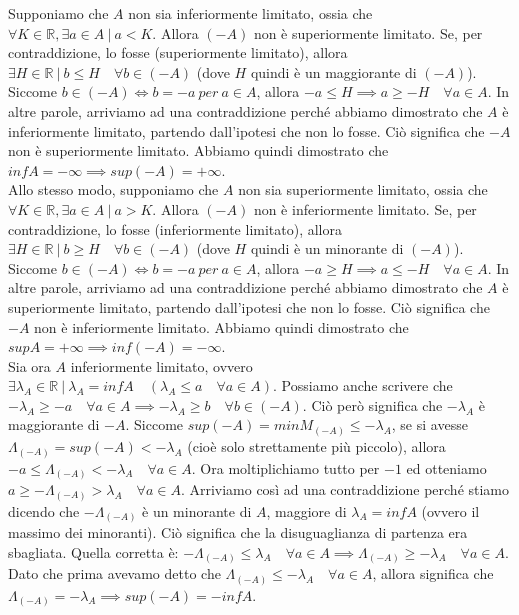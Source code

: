 \documentclass{article}
\begin{document}
\noindent Supponiamo che $A$ non sia inferiormente limitato, ossia che $\forall K \in \mathbb{R}, \exists a \in A \ | \ a < K$. Allora $(-A)$ non è superiormente limitato. Se, per contraddizione, lo fosse (superiormente limitato), allora $\exists H \in \mathbb{R} \ | \ b \leq H \quad \forall b \in (-A)$ (dove $H$ quindi è un maggiorante di $(-A)$). Siccome $b \in (-A) \iff b = -a \ per \ a \in A$, allora $-a \leq H \implies a \geq -H \quad \forall a \in A$. In altre parole, arriviamo ad una contraddizione perché abbiamo dimostrato che $A$ è inferiormente limitato, partendo dall'ipotesi che non lo fosse. Ciò significa che $-A$ non è superiormente limitato. Abbiamo quindi dimostrato che $infA = - \infty \implies sup(-A) = + \infty$.\\
Allo stesso modo, supponiamo che $A$ non sia superiormente limitato, ossia che $\forall K \in \mathbb{R}, \exists a \in A \ | \ a > K$. Allora $(-A)$ non è inferiormente limitato. Se, per contraddizione, lo fosse (inferiormente limitato), allora $\exists H \in \mathbb{R} \ | \ b \geq H \quad \forall b \in (-A)$ (dove $H$ quindi è un minorante di $(-A)$). Siccome $b \in (-A) \iff b = -a \ per \ a \in A$, allora $-a \geq H \implies a \leq -H \quad \forall a \in A$. In altre parole, arriviamo ad una contraddizione perché abbiamo dimostrato che $A$ è superiormente limitato, partendo dall'ipotesi che non lo fosse. Ciò significa che $-A$ non è inferiormente limitato. Abbiamo quindi dimostrato che $supA = + \infty \implies inf(-A) = - \infty$.\\
\noindent Sia ora $A$ inferiormente limitato, ovvero $\exists \lambda_A \in \mathbb{R} \ | \ \lambda_A = infA \quad (\lambda_A \leq a \quad \forall a \in A)$. Possiamo anche scrivere che $-\lambda_A \geq -a \quad \forall a \in A \implies -\lambda_A \geq b \quad \forall b \in (-A)$. Ciò però significa che $-\lambda_A$ è maggiorante di $-A$. Siccome $sup(-A) = minM_{(-A)} \leq -\lambda_A$, se si avesse $\Lambda_{(-A)} = sup(-A) < - \lambda_A$ (cioè solo strettamente più piccolo), allora $-a \leq \Lambda_{(-A)} < - \lambda_A \quad \forall a \in A$. Ora moltiplichiamo tutto per $-1$ ed otteniamo $a \geq - \Lambda_{(-A)} > \lambda_A \quad \forall a \in A$. Arriviamo così ad una contraddizione perché stiamo dicendo che $- \Lambda_{(-A)}$ è un minorante di $A$, maggiore di $\lambda_A = infA$ (ovvero il massimo dei minoranti). Ciò significa che la disuguaglianza di partenza era sbagliata. Quella corretta è: $- \Lambda_{(-A)} \leq \lambda_A \quad \forall a \in A \implies \Lambda_{(-A)} \geq - \lambda_A \quad \forall a \in A$. Dato che prima avevamo detto che $\Lambda_{(-A)} \leq - \lambda_A \quad \forall a \in A$, allora significa che $\Lambda_{(-A)} = - \lambda_A \implies sup(-A) = -infA$.\\
\end{document}
